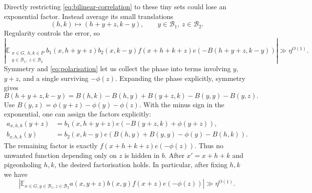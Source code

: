 \documentclass[11pt,a4paper]{article}
\newcommand{\E}{\mathbb E}
\newcommand{\bb}{\mathcal B}
\newcommand{\abs}[1]{\left|#1\right|}
\newcommand{\poly}{\eta^{O(1)}}
\theoremstyle{definition}
\numberwithin{equation}{section}
\begin{document}
Directly restricting \eqref{eq:bilinear-correlation} to these tiny
sets could lose an exponential factor. Instead average its small
translations
\[(h,k)\mapsto(h+y+z,k-y),\qquad y\in\bb_1,\ z\in\bb_2.\]
Regularity controls the error, so
\begin{equation}\label{eq:shifted-final}
\abs{\E_{\substack{x\in G,\ h,k\in P\\y\in\bb_1,\ z\in\bb_2}}
b_1(x,h+y+z)b_2(x,k-y)
f(x+h+k+z)e(-B(h+y+z,k-y))}\gg\poly.
\end{equation}
Symmetry and \eqref{eq:polarisation} let us collect the phase into
terms involving $y$, $y+z$, and a single surviving $-\phi(z)$.
Expanding the phase explicitly, symmetry gives
\[
B(h+y+z,k-y)=B(h,k)-B(h,y)+B(y+z,k)-B(y,y)-B(y,z).
\]
Use $B(y,z)=\phi(y+z)-\phi(y)-\phi(z)$. With the minus sign in the
exponential, one can assign the factors explicitly:
\[
\begin{aligned}
a_{x,h,k}(y+z)&=b_1(x,h+y+z)e(-B(y+z,k)+\phi(y+z)),\\
b_{x,h,k}(y)&=b_2(x,k-y)e(B(h,y)+B(y,y)-\phi(y)-B(h,k)).
\end{aligned}
\]
The remaining factor is exactly $f(x+h+k+z)e(-\phi(z))$.
Thus no unwanted function depending only on $z$ is hidden in $b$.
After $x'=x+h+k$ and pigeonholing $h,k$, the desired factorisation holds.
In particular, after fixing $h,k$ we have
\begin{equation}\label{eq:trilinear-final}
\abs{\E_{x\in G,y\in\bb_1,z\in\bb_2}
a(x,y+z)b(x,y)f(x+z)e(-\phi(z))}\gg\poly.
\end{equation}
\end{document}
